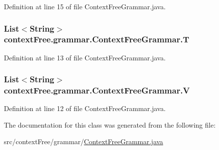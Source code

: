 Definition at line 15 of file Context\-Free\-Grammar.\-java.

\hypertarget{classcontext_free_1_1grammar_1_1_context_free_grammar_a5e6072d2c2f11703160c3c39c2968489}{
\subsubsection[{T}]{\setlength{\rightskip}{0pt plus 5cm}List$<$String$>$ {\bf context\-Free.\-grammar.\-Context\-Free\-Grammar.\-T}}}\label{classcontext_free_1_1grammar_1_1_context_free_grammar_a5e6072d2c2f11703160c3c39c2968489}


Definition at line 13 of file Context\-Free\-Grammar.\-java.

\hypertarget{classcontext_free_1_1grammar_1_1_context_free_grammar_a8cecf8ee3fe6ca01f58aacf390720746}{
\subsubsection[{V}]{\setlength{\rightskip}{0pt plus 5cm}List$<$String$>$ {\bf context\-Free.\-grammar.\-Context\-Free\-Grammar.\-V}}}\label{classcontext_free_1_1grammar_1_1_context_free_grammar_a8cecf8ee3fe6ca01f58aacf390720746}


Definition at line 12 of file Context\-Free\-Grammar.\-java.



The documentation for this class was generated from the following file\-:\begin{DoxyCompactItemize}
\item 
src/context\-Free/grammar/\hyperlink{_context_free_grammar_8java}{Context\-Free\-Grammar.\-java}\end{DoxyCompactItemize}
